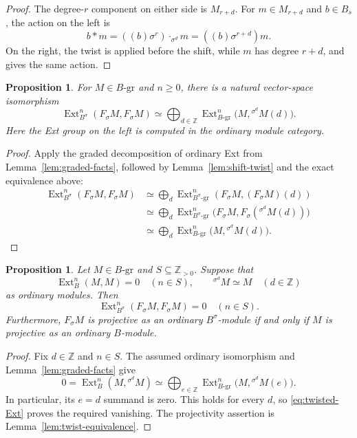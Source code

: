 \documentclass[10pt,a4paper]{amsart}
\numberwithin{equation}{section}
\newtheorem{proposition}[definition]{Proposition}
\DeclareMathOperator{\Ext}{Ext}
\newcommand{\Z}{\mathbb Z}
\newcommand{\gmod}[1]{#1\text{-}\mathrm{gr}}
\newcommand{\tw}[2]{{}^{#1}\!#2}
\begin{document}
\begin{proof}
The degree-\(r\) component on either side is \(M_{r+d}\).
For \(m\in M_{r+d}\) and \(b\in B_s\), the action on the left is
\[
 b*m=((b)\sigma^r)\cdot_{\sigma^d}m
     =((b)\sigma^{r+d})m.
\]
On the right, the twist is applied before the shift, while \(m\) has
degree \(r+d\), and gives the same action.
\end{proof}

\begin{proposition}\label{prop:twisted-Ext}
For \(M\in\gmod{B}\) and \(n\geq0\), there is a natural
vector-space isomorphism
\begin{equation}\label{eq:twisted-Ext}
 \Ext_{B^\sigma}^n(F_\sigma M,F_\sigma M)
 \simeq
 \bigoplus_{d\in\Z}
 \Ext_{\gmod{B}}^n\bigl(M,\tw{\sigma^d}{M}(d)\bigr).
\end{equation}
Here the Ext group on the left is computed in the ordinary module
category.
\end{proposition}

\begin{proof}
Apply the graded decomposition of ordinary Ext from
Lemma~\ref{lem:graded-facts}, followed by
Lemma~\ref{lem:shift-twist} and the exact equivalence above:
\begin{align*}
 \Ext_{B^\sigma}^n(F_\sigma M,F_\sigma M)
 &\simeq\bigoplus_d
 \Ext_{\gmod{B^\sigma}}^n(F_\sigma M,(F_\sigma M)(d))\\
 &\simeq\bigoplus_d
 \Ext_{\gmod{B^\sigma}}^n
 \bigl(F_\sigma M,F_\sigma(\tw{\sigma^d}{M}(d))\bigr)\\
 &\simeq\bigoplus_d
 \Ext_{\gmod{B}}^n\bigl(M,\tw{\sigma^d}{M}(d)\bigr).
\end{align*}
\end{proof}

\begin{proposition}\label{prop:transport}
Let \(M\in\gmod{B}\) and \(S\subseteq\Z_{>0}\). Suppose that
\[
 \Ext_B^n(M,M)=0\quad(n\in S),
 \qquad \tw{\sigma^d}{M}\simeq M\quad(d\in\Z)
\]
as ordinary modules. Then
\[
 \Ext_{B^\sigma}^n(F_\sigma M,F_\sigma M)=0\quad(n\in S).
\]
Furthermore, \(F_\sigma M\) is projective as an ordinary
\(B^\sigma\)-module if and only if \(M\) is projective as an
ordinary \(B\)-module.
\end{proposition}

\begin{proof}
Fix \(d\in\Z\) and \(n\in S\). The assumed ordinary isomorphism
and Lemma~\ref{lem:graded-facts} give
\[
 0=\Ext_B^n(M,\tw{\sigma^d}{M})
 \simeq\bigoplus_{e\in\Z}
 \Ext_{\gmod{B}}^n\bigl(M,\tw{\sigma^d}{M}(e)\bigr).
\]
In particular, its \(e=d\) summand is zero. This holds for every
\(d\), so \eqref{eq:twisted-Ext} proves the required vanishing.
The projectivity assertion is Lemma~\ref{lem:twist-equivalence}.
\end{proof}
\end{document}
